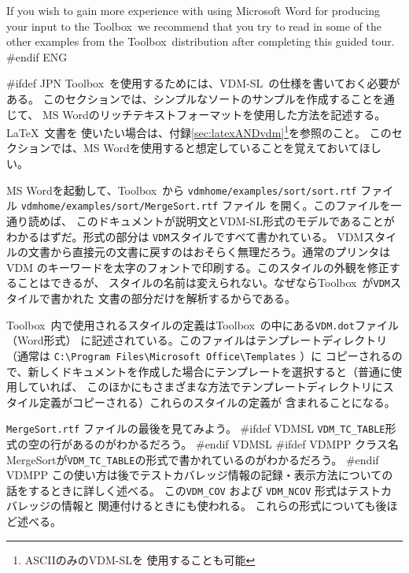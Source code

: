 \documentclass[\pformat,12pt]{article}
\newcommand{\vdmslpp}{VDM-SL}
\newcommand{\Toolbox}{Toolbox}
\newcommand{\vdmhome}{vdmhome}
\newcommand{\vdmslpp}{VDM++}
\newcommand{\Toolbox}{Toolbox}
\newcommand{\vdmhome}{vpphome}
\begin{document}
If you wish to gain more experience with using Microsoft Word for
producing your input to the \Toolbox\ we recommend that you try to
read in some of the other examples from the \Toolbox\ distribution
after completing this guided tour.
#endif ENG

#ifdef JPN
\Toolbox\ を使用するためには、\vdmslpp\ の仕様を書いておく必要がある。
このセクションでは、シンプルなソートのサンプルを作成することを通じて、
MS Wordのリッチテキストフォーマットを使用した方法を記述する。\LaTeX\ 文書を
使いたい場合は、付録\ref{sec:latexANDvdm}\footnote{ASCIIのみの\vdmslpp を
使用することも可能}を参照のこと。
このセクションでは、MS Wordを使用すると想定していることを覚えておいてほしい。

MS Wordを起動して、\Toolbox\ から
{
{\tt \vdmhome/examples/sort/sort.rtf}
  ファイル
}
{
{\tt \vdmhome/examples/sort/MergeSort.rtf} ファイル
}を開く。このファイルを一通り読めば、
このドキュメントが説明文と\vdmslpp 形式のモデルであることがわかるはずだ。形式の部分は
\texttt{VDM}スタイルですべて書かれている。
VDMスタイルの文書から直接元の文書に戻すのはおそらく無理だろう。通常のプリンタはVDM
のキーワードを太字のフォントで印刷する。このスタイルの外観を修正することはできるが、
スタイルの名前は変えられない。なぜなら\Toolbox\ が\texttt{VDM}スタイルで書かれた
文書の部分だけを解析するからである。

\Toolbox\ 内で使用されるスタイルの定義は\Toolbox\ の中にある{\tt VDM.dot}ファイル（Word形式）
に記述されている。このファイルはテンプレートディレクトリ（通常は
\verb+C:\Program Files\Microsoft Office\Templates+ ）に
コピーされるので、新しくドキュメントを作成した場合にテンプレートを選択すると（普通に使用していれば、
このほかにもさまざまな方法でテンプレートディレクトリにスタイル定義がコピーされる）これらのスタイルの定義が
含まれることになる。

%
{{\tt MergeSort.rtf} ファイル}の最後を見てみよう。
#ifdef VDMSL
\texttt{VDM\_TC\_TABLE}形式の空の行があるのがわかるだろう。
#endif VDMSL
#ifdef VDMPP
クラス名MergeSortが\texttt{VDM\_TC\_TABLE}の形式で書かれているのがわかるだろう。
#endif VDMPP
この使い方は後でテストカバレッジ情報の記録・表示方法についての話をするときに詳しく述べる。
この\texttt{VDM\_COV} および \texttt{VDM\_NCOV} 形式はテストカバレッジの情報と
関連付けるときにも使われる。
これらの形式についても後ほど述べる。
\end{document}
